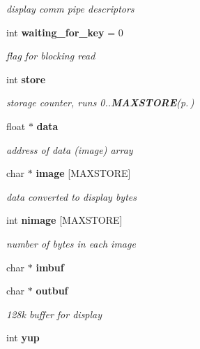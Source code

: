 \begin{CompactItemize}
\begin{CompactList}\small\item\em display comm pipe descriptors \item\end{CompactList}\item 
int {\bf waiting\_\-for\_\-key} = 0\label{xtvutils_8c_a71}

\begin{CompactList}\small\item\em flag for blocking read \item\end{CompactList}\item 
int {\bf store}\label{xtvutils_8c_a72}

\begin{CompactList}\small\item\em storage counter, runs 0..{\bf MAXSTORE}{\rm (p.\,\pageref{xtv_8h_a28})} \item\end{CompactList}\item 
float $\ast$ {\bf data}\label{xtvutils_8c_a73}

\begin{CompactList}\small\item\em address of data (image) array \item\end{CompactList}\item 
char $\ast$ {\bf image} [MAXSTORE]\label{xtvutils_8c_a74}

\begin{CompactList}\small\item\em data converted to display bytes \item\end{CompactList}\item 
int {\bf nimage} [MAXSTORE]\label{xtvutils_8c_a75}

\begin{CompactList}\small\item\em number of bytes in each image \item\end{CompactList}\item 
char $\ast$ {\bf imbuf}\label{xtvutils_8c_a76}

\item 
char $\ast$ {\bf outbuf}\label{xtvutils_8c_a77}

\begin{CompactList}\small\item\em 128k buffer for display \item\end{CompactList}\item 
int {\bf yup}\label{xtvutils_8c_a78}


\end{CompactItemize}
